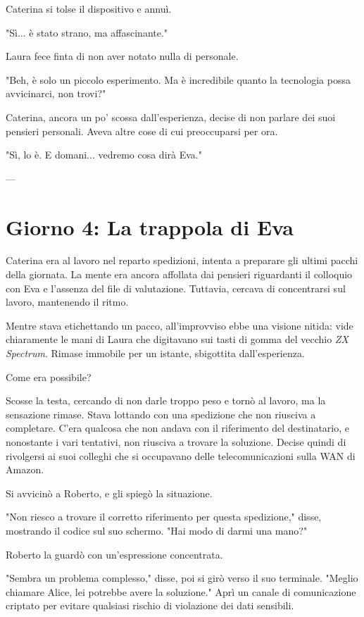 Caterina si tolse il dispositivo e annuì.

"Sì... è stato strano, ma affascinante."

Laura fece finta di non aver notato nulla di personale.

"Beh, è solo un piccolo esperimento. Ma è incredibile quanto la tecnologia possa avvicinarci, non trovi?"

Caterina, ancora un po' scossa dall'esperienza, decise di non parlare dei suoi pensieri personali. Aveva altre cose di cui preoccuparsi per ora.

"Sì, lo è. E domani... vedremo cosa dirà Eva."

---

\chapter{Giorno 4: La trappola di Eva}

Caterina era al lavoro nel reparto spedizioni, intenta a preparare gli ultimi pacchi della giornata. La mente era ancora affollata dai pensieri riguardanti il colloquio con Eva e l'assenza del file di valutazione. Tuttavia, cercava di concentrarsi sul lavoro, mantenendo il ritmo.

Mentre stava etichettando un pacco, all'improvviso ebbe una visione nitida: vide chiaramente le mani di Laura che digitavano sui tasti di gomma del vecchio \emph{ZX Spectrum}. Rimase immobile per un istante, sbigottita dall'esperienza.

Come era possibile?

Scosse la testa, cercando di non darle troppo peso e tornò al lavoro, ma la sensazione rimase. Stava lottando con una spedizione che non riusciva a completare. C'era qualcosa che non andava con il riferimento del destinatario, e nonostante i vari tentativi, non riusciva a trovare la soluzione. Decise quindi di rivolgersi ai suoi colleghi che si occupavano delle telecomunicazioni sulla WAN di Amazon.

Si avvicinò a Roberto, e gli spiegò la situazione.

"Non riesco a trovare il corretto riferimento per questa spedizione," disse, mostrando il codice sul suo schermo. "Hai modo di darmi una mano?"

Roberto la guardò con un'espressione concentrata.

"Sembra un problema complesso," disse, poi si girò verso il suo terminale. "Meglio chiamare Alice, lei potrebbe avere la soluzione." Aprì un canale di comunicazione criptato per evitare qualsiasi rischio di violazione dei dati sensibili.

